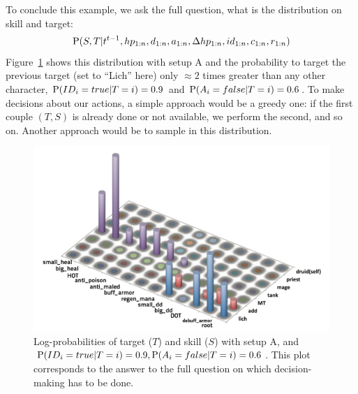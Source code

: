 To conclude this example, we ask the full question, what is the distribution on skill and target:
$$\mathrm{P}(S,T|t^{t-1},hp_{1:n},d_{1:n}, a_{1:n}, \Delta hp_{1:n}, id_{1:n}, c_{1:n}, r_{1:n})$$
Figure~\ref{fig:wow_target_skill} shows this distribution %
with setup A and the probability to target the previous target (set to ``Lich'' here) only $\approx 2$ times greater than any other character, %
$\mathrm{P}(ID_i=true|T=i)=0.9$ and $\mathrm{P}(A_i=false|T=i)=0.6$. To make decisions about our actions, a simple approach would be a greedy one: if the first couple $(T,S)$ is already done or not available, we perform the second, and so on. Another approach would be to sample in this distribution.

\begin{figure}[h!]
\begin{center}
\includegraphics[width=12.5cm]{images/wow_distrib_target_skill.png}
\caption{Log-probabilities of target ($T$) and skill ($S$) with setup A, and $\mathrm{P}(ID_i=true|T=i)=0.9, \mathrm{P}(A_i=false|T=i)=0.6$. This plot corresponds to the answer to the full question on which decision-making has to be done.}
\label{fig:wow_target_skill}
\end{center}
\end{figure}

